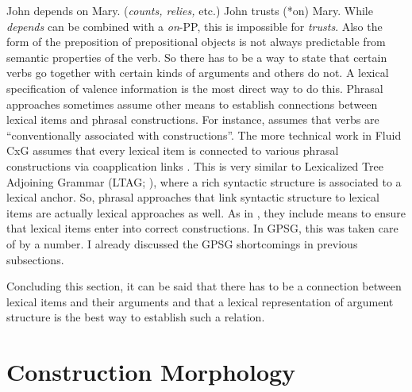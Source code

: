 \documentclass[output=paper
	        ,collection
	        ,collectionchapter
 	        ,biblatex
                ,babelshorthands
                ,newtxmath
                ,draftmode
                ,colorlinks, citecolor=brown
]{langscibook}
\begin{document}
\eal\label{depends-on-ex}
\ex John depends on Mary.  (\emph{counts, relies,} etc.)
\ex John trusts (*on) Mary.  
\zl
While \emph{depends} can be combined with a \emph{on}-PP, this is impossible for \emph{trusts}. Also
the form of the preposition of prepositional objects is not always predictable from semantic
properties of the verb. So there has to be a way to state that certain verbs go together with
certain kinds of arguments and others do not. A lexical specification of valence information is the
most direct way to do this. Phrasal approaches sometimes assume other means to establish connections
between lexical items and phrasal constructions. For instance, \citet[]{Goldberg95a} assumes
that verbs are ``conventionally associated with constructions''. The more technical work in Fluid
CxG assumes that every lexical item is connected to various phrasal constructions via coapplication
links \citep[]{vanTrijp2011a}. This is very similar to Lexicalized Tree Adjoining
Grammar
(LTAG; \citealt*{SAJ88a-u}), where a rich syntactic structure is associated to a lexical anchor. So,
phrasal approaches that link syntactic structure to lexical items are actually lexical
approaches as well. As in \gpsg, they include means to ensure that lexical items enter into correct
constructions. In GPSG, this was taken care of by a number. I already discussed the GPSG shortcomings
in previous subsections.

Concluding this section, it can be said that there has to be a connection between lexical items and
their arguments and that a lexical representation of argument structure is the best way to establish
such a relation.


\section{Construction Morphology}
\label{sec-cxg-morphology}
\end{document}
